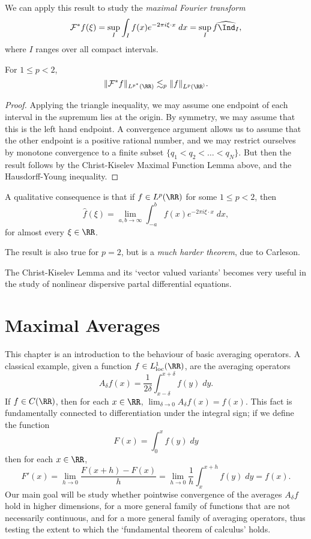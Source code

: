 We can apply this result to study the \emph{maximal Fourier transform}
%
\[ \mathcal{F}^* f(\xi) = \sup_I \int_I f(x) e^{-2 \pi i \xi \cdot x}\; dx = \sup_I \widehat{f \Ind_I}, \]
%
where $I$ ranges over all compact intervals.

\begin{theorem}
    For $1 \leq p < 2$,
    \[ \| \mathcal{F}^* f \|_{L^{p^*}(\RR)} \lesssim_p \| f \|_{L^p(\RR^)}. \]
\end{theorem}
\begin{proof}
    Applying the triangle inequality, we may assume one endpoint of each interval in the supremum lies at the origin. By symmetry, we may assume that this is the left hand endpoint. A convergence argument allows us to assume that the other endpoint is a positive rational number, and we may restrict ourselves by monotone convergence to a finite subset $\{ q_1 < q_2 < \dots < q_N \}$. But then the result follows by the Christ-Kiselev Maximal Function Lemma above, and the Hausdorff-Young inequality.
\end{proof}

A qualitative consequence is that if $f \in L^p(\RR)$ for some $1 \leq p < 2$, then
%
\[ \widehat{f}(\xi) = \lim_{a,b \to \infty} \int_{-a}^b f(x) e^{-2 \pi i \xi \cdot x}\; dx, \]
%
for almost every $\xi \in \RR$.

\begin{remark}
    The result is also true for $p = 2$, but is a \emph{much harder theorem}, due to Carleson.
\end{remark}

The Christ-Kiselev Lemma and its `vector valued variants' becomes very useful in the study of nonlinear dispersive partal differential equations.








\chapter{Maximal Averages}

This chapter is an introduction to the behaviour of basic averaging operators. A classical example, given a function $f \in L^1_{\text{loc}}(\RR)$, are the averaging operators
%
\[ A_\delta f(x) = \frac{1}{2\delta} \int_{x-\delta}^{x+\delta} f(y)\; dy. \]
%
If $f \in C(\RR)$, then for each $x \in \RR$, $\lim_{\delta \to 0} A_\delta f(x) = f(x)$. This fact is fundamentally connected to differentiation under the integral sign; if we define the function
%
\[ F(x) = \int_0^x f(y)\; dy \]
%
then for each $x \in \RR$,
%
\[ F'(x) = \lim_{h \to 0} \frac{F(x+h) - F(x)}{h} = \lim_{h \to 0} \frac{1}{h} \int_x^{x+h} f(y)\; dy = f(x). \]
%
Our main goal will be study whether pointwise convergence of the averages $A_\delta f$ hold in higher dimensions, for a more general family of functions that are not necessarily continuous, and for a more general family of averaging operators, thus testing the extent to which the `fundamental theorem of calculus' holds.

